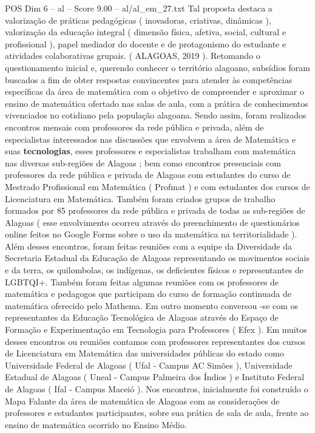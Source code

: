 \begin{textsample}{POS Dim 6 – al – Score 9.00 – al/al\_em\_27.txt}
Tal proposta destaca a valorização de práticas pedagógicas ( inovadoras, criativas, dinâmicas ), valorização da educação integral ( dimensão física, afetiva, social, cultural e profissional ), papel mediador do docente e de protagonismo do estudante e atividades colaborativas grupais. ( ALAGOAS, 2019 ).
Retomando o questionamento inicial e, querendo conhecer o território alagoano, subsídios foram buscados a fim de obter respostas convincentes para atender às competências específicas da área de matemática com o objetivo de compreender e aproximar o ensino de matemática ofertado nas salas de aula, com a prática de conhecimentos vivenciados no cotidiano pela população alagoana.
Sendo assim, foram realizados encontros mensais com professores da rede pública e privada, além de especialistas interessados nas discussões que envolvem a área de Matemática e suas \textbf{tecnologias}, esses professores e especialistas trabalham com matemática nas diversas sub-regiões de Alagoas ; bem como encontros presenciais com professores da rede pública e privada de Alagoas com estudantes do curso de Mestrado Profissional em Matemática ( Profmat ) e com estudantes dos cursos de Licenciatura em Matemática.
Também foram criados grupos de trabalho formados por 85 professores da rede pública e privada de todas as sub-regiões de Alagoas ( esse envolvimento ocorreu através do preenchimento de questionários online feitos no Google Forms sobre o uso da matemática na territorialidade ).
Além desses encontros, foram feitas reuniões com a equipe da Diversidade da Secretaria Estadual da Educação de Alagoas representando os movimentos sociais e da terra, os quilombolas, os indígenas, os deficientes físicos e representantes de LGBTQI+.
Também foram feitas algumas reuniões com os professores de matemática e pedagogos que participam do curso de formação continuada de matemática oferecido pelo Mathema.
Em outro momento conversou -se com os representantes da Educação Tecnológica de Alagoas através do Espaço de Formação e Experimentação em Tecnologia para Professores ( Efex ).
Em muitos desses encontros ou reuniões contamos com professores representantes dos cursos de Licenciatura em Matemática das universidades públicas do estado como Universidade Federal de Alagoas ( Ufal - Campus AC Simões ), Universidade Estadual de Alagoas ( Uneal - Campus Palmeira dos Índios ) e Instituto Federal de Alagoas ( Ifal - Campus Maceió ).
Nos encontros, inicialmente foi construído o Mapa Falante da área de matemática de Alagoas com as considerações de professores e estudantes participantes, sobre sua prática de sala de aula, frente ao ensino de matemática ocorrido no Ensino Médio.

\end{textsample}
